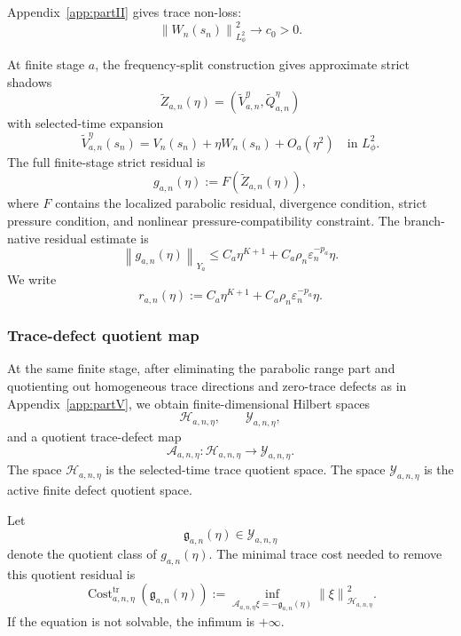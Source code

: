 \documentclass[11pt]{article}
\numberwithin{equation}{section}
\theoremstyle{plain}
\theoremstyle{definition}
\theoremstyle{remark}
\DeclareMathOperator{\Cost}{Cost}
\newcommand{\eps}{\varepsilon}
\newcommand{\tr}{\operatorname{tr}}
\newcommand{\norm}[2]{\left\|#1\right\|_{#2}}
\newcommand{\calA}{\mathcal A}
\newcommand{\calH}{\mathcal H}
\newcommand{\calY}{\mathcal Y}
\begin{document}
Appendix~\ref{app:partII} gives trace non-loss:
\begin{equation}\label{pVI:eq:trace-nonloss}
        \norm{W_n(s_n)}{L^2_\phi}^2\to c_0>0.
\end{equation}

At finite stage \(a\), the frequency-split construction gives approximate strict shadows
\[
        \widetilde Z_{a,n}(\eta)
        =
        (\widetilde V_{a,n}^\eta,\widetilde Q_{a,n}^\eta)
\]
with selected-time expansion
\begin{equation}\label{pVI:eq:selected-expansion}
        \widetilde V_{a,n}^{\eta}(s_n)
        =
        V_n(s_n)+\eta W_n(s_n)+O_a(\eta^2)
        \quad
        \text{in }L^2_\phi.
\end{equation}
The full finite-stage strict residual is
\[
        g_{a,n}(\eta)
        :=
        F(\widetilde Z_{a,n}(\eta)),
\]
where \(F\) contains the localized parabolic residual, divergence condition, strict pressure
condition, and nonlinear pressure-compatibility constraint.  The branch-native residual estimate is
\begin{equation}\label{pVI:eq:branch-native-residual}
        \norm{g_{a,n}(\eta)}{Y_a}
        \le
        C_a\eta^{K+1}
        +
        C_a\rho_n\eps_n^{-p_a}\eta.
\end{equation}
We write
\begin{equation}\label{pVI:eq:r-def}
        r_{a,n}(\eta)
        :=
        C_a\eta^{K+1}
        +
        C_a\rho_n\eps_n^{-p_a}\eta.
\end{equation}

\subsubsection{Trace-defect quotient map}

At the same finite stage, after eliminating the parabolic range part and quotienting out homogeneous
trace directions and zero-trace defects as in Appendix~\ref{app:partV}, we obtain finite-dimensional Hilbert spaces
\[
        \calH_{a,n,\eta},
        \qquad
        \calY_{a,n,\eta},
\]
and a quotient trace-defect map
\begin{equation}\label{pVI:eq:A-map}
        \calA_{a,n,\eta}:\calH_{a,n,\eta}\to\calY_{a,n,\eta}.
\end{equation}
The space \(\calH_{a,n,\eta}\) is the selected-time trace quotient space.  The space
\(\calY_{a,n,\eta}\) is the active finite defect quotient space.

Let
\[
        \mathfrak g_{a,n}(\eta)
        \in
        \calY_{a,n,\eta}
\]
denote the quotient class of \(g_{a,n}(\eta)\).  The minimal trace cost needed to remove this
quotient residual is
\begin{equation}\label{pVI:eq:trace-cost-def}
        \Cost_{a,n,\eta}^{\tr}(\mathfrak g_{a,n}(\eta))
        :=
        \inf_{\calA_{a,n,\eta}\xi=-\mathfrak g_{a,n}(\eta)}
        \norm{\xi}{\calH_{a,n,\eta}}^2.
\end{equation}
If the equation is not solvable, the infimum is \(+\infty\).
\end{document}
